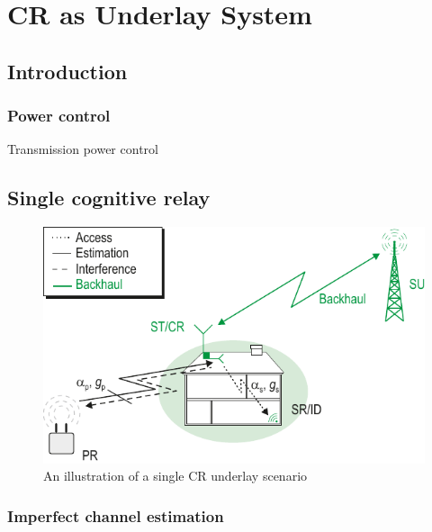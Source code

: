 \chapter{CR as Underlay System}
\label{chapter:US}

\section{Introduction}
\subsection{Power control}
Transmission power control

\section{Single cognitive relay}
\begin{figure}[!t]
     \includegraphics[trim=0cm 0.0cm 0.0cm 0cm,clip=true,width=\columnwidth]{../kapitel04/figures/CR_Scenario_Underlay}
\caption{An illustration of a single \ac{CR} underlay scenario}
\label{fig:Und_Sc}
\end{figure}


\subsection{Imperfect channel estimation}




